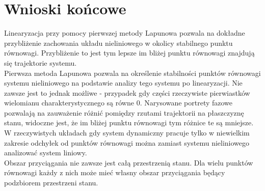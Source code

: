\documentclass[a4paper,11pt]{article}
\begin{document}
\section{Wnioski końcowe}
Linearyzacja przy pomocy pierwszej metody Lapunowa pozwala na dokładne przybliżenie zachowania układu nieliniowego w okolicy stabilnego punktu równowagi. Przybliżenie to jest tym lepsze im bliżej punktu równowagi znajdują się trajektorie systemu. \\
Pierwsza metoda Lapunowa pozwala na określenie stabilności punktów równowagi systemu nieliniowego na podstawie analizy tego systemu po linearyzacji. Nie zawsze jest to jednak możliwe - przypadek gdy części rzeczywiste pierwiastków wielomianu charakterystycznego są równe 0. 
Narysowane portrety fazowe pozwalają na zauważenie różnić pomiędzy rzutami trajektorii na płaszczyznę stanu, widoczne jest, że im bliżej punktu równowagi tym różnice te są mniejsze. \\
W rzeczywistych układach gdy system dynamiczny pracuje tylko w niewielkim zakresie odchyłek od punktów równowagi można zamiast systemu nieliniowego analizować system liniowy. \\
Obszar przyciągania nie zawsze jest całą przestrzenią stanu. Dla wielu punktów równowagi każdy z nich może mieć własny obszar przyciągania będący podzbiorem przestrzeni stanu.
\end{document}
